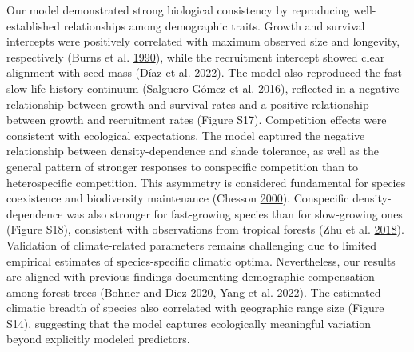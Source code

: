 \documentclass[12pt]{article}
\begin{document}
Our model demonstrated strong biological consistency by reproducing
well-established relationships among demographic traits. Growth and
survival intercepts were positively correlated with maximum observed
size and longevity, respectively (Burns et al.
\protect\hyperlink{ref-burns1990silvics}{1990}), while the recruitment
intercept showed clear alignment with seed mass (Díaz et al.
\protect\hyperlink{ref-diaz2022}{2022}). The model also reproduced the
fast--slow life-history continuum (Salguero-Gómez et al.
\protect\hyperlink{ref-SalgueroGomez2016}{2016}), reflected in a
negative relationship between growth and survival rates and a positive
relationship between growth and recruitment rates (Figure S17).
Competition effects were consistent with ecological expectations. The
model captured the negative relationship between density-dependence and
shade tolerance, as well as the general pattern of stronger responses to
conspecific competition than to heterospecific competition. This
asymmetry is considered fundamental for species coexistence and
biodiversity maintenance (Chesson
\protect\hyperlink{ref-Chesson2000a}{2000}). Conspecific
density-dependence was also stronger for fast-growing species than for
slow-growing ones (Figure S18), consistent with observations from
tropical forests (Zhu et al. \protect\hyperlink{ref-Zhu2018}{2018}).
Validation of climate-related parameters remains challenging due to
limited empirical estimates of species-specific climatic optima.
Nevertheless, our results are aligned with previous findings documenting
demographic compensation among forest trees (Bohner and Diez
\protect\hyperlink{ref-bohner2020}{2020}, Yang et al.
\protect\hyperlink{ref-Yang2022}{2022}). The estimated climatic breadth
of species also correlated with geographic range size (Figure S14),
suggesting that the model captures ecologically meaningful variation
beyond explicitly modeled predictors.
\end{document}
